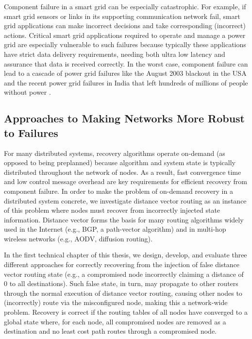Component failure in a smart grid can be especially catastrophic.
For example, if smart grid sensors or links in its supporting communication network fail, smart grid applications can make incorrect decisions and take corresponding (incorrect) actions. 
Critical smart grid applications required to operate and manage a power grid are especially vulnerable to such failures because typically these applications have strict data delivery requirements,
needing both ultra low latency and assurance that data is received correctly. 
In the worst case, component failure can lead to a cascade of power grid failures like the August 2003 blackout in the USA \cite{2003Blackout} and the 
recent power grid failures in India that left hundreds of millions of people without power  \cite{IndiaBlackout}.






\subsection{Approaches to Making Networks More Robust to Failures}



For many distributed systems, recovery algorithms operate on-demand (as opposed to being preplanned) because algorithm and system state is typically distributed throughout the network of nodes.  
As a result, fast convergence time and low control message overhead are key requirements for efficient recovery from component failure. 
In order to make the problem of on-demand recovery in a distributed system concrete, we investigate distance vector routing as an instance of this problem where nodes must recover
from incorrectly injected state information.
Distance vector forms the basis for many routing algorithms widely used in the Internet (e.g., BGP, a path-vector algorithm) and in multi-hop wireless networks (e.g., AODV, diffusion routing).

In the first technical chapter of this thesis, we design, develop, and evaluate three different approaches for correctly recovering from the injection of false distance vector routing state (e.g., a compromised node incorrectly
claiming a distance of $0$ to all destinations). Such false state, in turn, may propagate to other routers through the normal execution of distance vector routing, causing other nodes to (incorrectly) route via the misconfigured node, making this a network-wide problem.
Recovery is correct if the routing tables of all nodes have converged to a global state where, for each node, all compromised nodes are removed as a destination and
no least cost path routes through a compromised node.  

